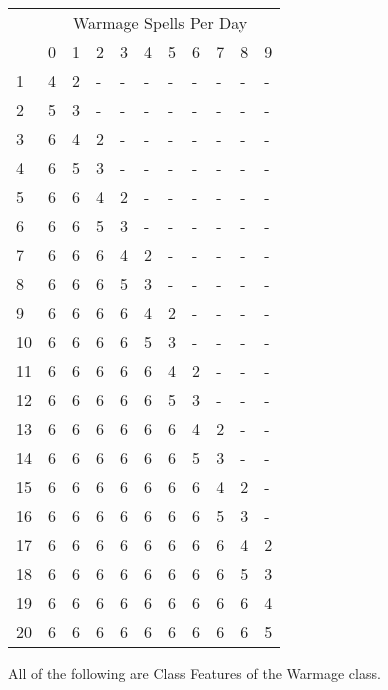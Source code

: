 \begin{table}[htb]
\begin{small}
\noindent\begin{tabular}{lllllllllll}
 & \multicolumn{10}{c}{Warmage Spells Per Day}\\
 &0 &1 &2 &3 &4 &5 &6 &7 &8 &9\\
1 &4 &2 &- &- &- &- &- &- &- &-\\
2 &5 &3 &- &- &- &- &- &- &- &-\\
3 &6 &4 &2 &- &- &- &- &- &- &-\\
4 &6 &5 &3 &- &- &- &- &- &- &-\\
5 &6 &6 &4 &2 &- &- &- &- &- &-\\
6 &6 &6 &5 &3 &- &- &- &- &- &-\\
7 &6 &6 &6 &4 &2 &- &- &- &- &-\\
8 &6 &6 &6 &5 &3 &- &- &- &- &-\\
9 &6 &6 &6 &6 &4 &2 &- &- &- &-\\
10 &6 &6 &6 &6 &5 &3 &- &- &- &-\\
11 &6 &6 &6 &6 &6 &4 &2 &- &- &-\\
12 &6 &6 &6 &6 &6 &5 &3 &- &- &-\\
13 &6 &6 &6 &6 &6 &6 &4 &2 &- &-\\
14 &6 &6 &6 &6 &6 &6 &5 &3 &- &-\\
15 &6 &6 &6 &6 &6 &6 &6 &4 &2 &-\\
16 &6 &6 &6 &6 &6 &6 &6 &5 &3 &-\\
17 &6 &6 &6 &6 &6 &6 &6 &6 &4 &2\\
18 &6 &6 &6 &6 &6 &6 &6 &6 &5 &3\\
19 &6 &6 &6 &6 &6 &6 &6 &6 &6 &4\\
20 &6 &6 &6 &6 &6 &6 &6 &6 &6 &5\\
\end{tabular}
\end{small}
\end{table}

\smallskip\noindent All of the following are Class Features of the Warmage class.



